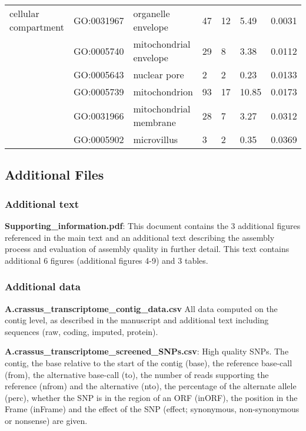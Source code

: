 \documentclass[10pt]{bmc_article}
\newenvironment{bmcformat}{\begin{raggedright}\baselineskip20pt\sloppy\setboolean{publ}{false}}{\end{raggedright}\baselineskip20pt\sloppy}
\begin{document}
\begin{bmcformat}
\begin{longtable}{p{1.7cm}lp{4.5cm}p{1cm}p{1cm}ll}
   \hline
cellular compartment & GO:0031967 & organelle envelope &  47 &  12 & 5.49 & 0.0031 \\ 
   & GO:0005740 & mitochondrial envelope &  29 &   8 & 3.38 & 0.0112 \\ 
   & GO:0005643 & nuclear pore &   2 &   2 & 0.23 & 0.0133 \\ 
   & GO:0005739 & mitochondrion &  93 &  17 & 10.85 & 0.0173 \\ 
   & GO:0031966 & mitochondrial membrane &  28 &   7 & 3.27 & 0.0312 \\ 
   & GO:0005902 & microvillus &   3 &   2 & 0.35 & 0.0369 \\ 
   \hline
\hline
\end{longtable}
\normalsize


\subsection*{Additional Files}

\subsubsection*{Additional text}

\textbf{Supporting\_information.pdf}: This document contains the 3
additional figures referenced in the main text and an additional text
describing the assembly process and evaluation of assembly quality in
further detail. This text contains additional 6 figures (additional
figures 4-9) and 3 tables.

\subsubsection*{Additional data}

\textbf{A.crassus\_transcriptome\_contig\_data.csv} All data computed
on the contig level, as described in the manuscript and additional
text including sequences (raw, coding, imputed, protein).

\textbf{A.crassus\_transcriptome\_screened\_SNPs.csv}: High quality
SNPs. The contig, the base relative to the start of the contig (base),
the reference base-call (from), the alternative base-call (to), the
number of reads supporting the reference (nfrom) and the alternative
(nto), the percentage of the alternate allele (perc), whether the SNP
is in the region of an ORF (inORF), the position in the Frame
(inFrame) and the effect of the SNP (effect; synonymous,
non-synonymous or nonsense) are given.


\end{bmcformat}
\end{document}
